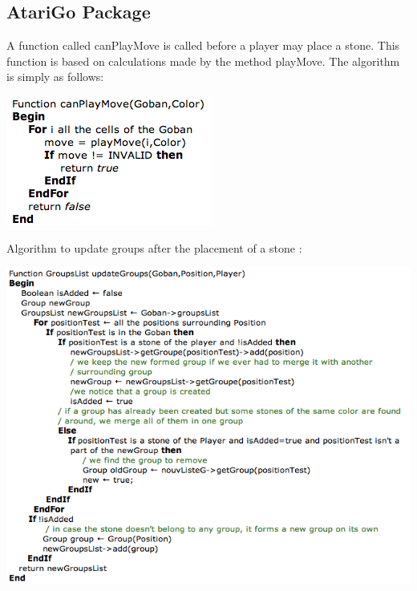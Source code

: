 \documentclass[11pt,a4paper]{report}
\begin{document}
\subsection*{AtariGo Package}

A function called canPlayMove is called before a player may place a stone. This function is based on calculations made by the method playMove. The algorithm is simply as follows:\\

\begin{center}
\includegraphics[scale=0.60]{images/canPlayMove.png}
\end{center}

\newpage 

Algorithm to update groups after the placement of a stone : \\

\begin{center}
\includegraphics[scale=0.60]{images/updateGroup.png}
\end{center}
\end{document}

